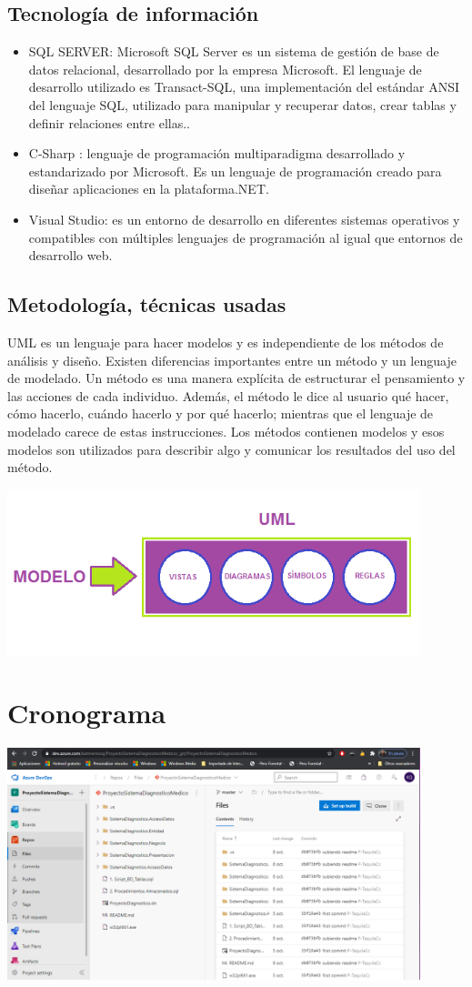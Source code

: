 \documentclass[preprint,12pt]{elsarticle}
\begin{document}
\subsection{\textbf{Tecnología de información  }}
		\begin{itemize}
	\item 	SQL SERVER: Microsoft SQL Server es un sistema de gestión de base de datos relacional, desarrollado por la empresa Microsoft. El lenguaje de desarrollo utilizado es Transact-SQL, una implementación del estándar ANSI del lenguaje SQL, utilizado para manipular y recuperar datos, crear tablas y definir relaciones entre ellas..
	\item 	C-Sharp : lenguaje de programación multiparadigma desarrollado y estandarizado por Microsoft. Es un lenguaje de programación creado para diseñar aplicaciones en la plataforma.NET.
	\item 	Visual Studio: es un entorno de desarrollo en diferentes sistemas operativos y compatibles con múltiples lenguajes de programación al igual que entornos de desarrollo web. 
	\end{itemize}
\subsection{\textbf{ Metodología, técnicas usadas  }}
UML es un lenguaje para hacer modelos y es independiente de los métodos de análisis y diseño. Existen diferencias importantes entre un método y un lenguaje de modelado. Un método es una manera explícita de estructurar el pensamiento y las acciones de cada individuo. Además, el método le dice al usuario qué hacer, cómo hacerlo, cuándo hacerlo y por qué hacerlo; mientras que el lenguaje de modelado carece de estas instrucciones. Los métodos contienen modelos y esos modelos son utilizados para describir algo y comunicar los resultados del uso del método.
          \begin{center}
	\includegraphics[width=12cm]{./imagen/5} 
	\end{center}
		
\section{Cronograma }

	\begin{center}
	\includegraphics[width=12cm]{./imagen/20} 
	\end{center}
\end{document}
